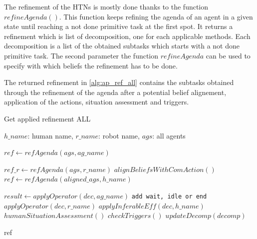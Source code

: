 \documentclass[letterpaper]{article} %
\begin{document}
The refinement of the HTNs is mostly done thanks to the function $refineAgenda()$. This function keeps refining the agenda of an agent in a given state until reaching a not done primitive task at the first spot. It returns a refinement which is list of decomposition, one for each applicable methods. Each decomposition is a list of the obtained subtasks which starts with a not done primitive task. The second parameter the function $refineAgenda$ can be used to specify with which beliefs the refinement has to be done. 

The returned refinement in \ref{alg:ap_ref_all} contains the subtasks obtained through the refinement of the agenda after a potential belief alignement, application of the actions, situation assessment and triggers.

\begin{algorithm}
\caption{Get applied refinement ALL}\label{alg:ap_ref_all}
\begin{algorithmic}
\Require $h\_name$: human name, $r\_name$: robot name, $ags$: all agents

\State $ref \gets refAgenda(ags, ag\_name)$

\State $ref\_r \gets refAgenda(ags, r\_name)$ 
 
    \State $alignBeliefsWithComAction()$
    \State $ref \gets refAgenda(aligned\_ags, h\_name)$
\EndIf


    \State $result \gets applyOperator(dec, ag\_name)$ 
        \State \texttt{add wait, idle or end}
    \Else
        \State $applyOperator(dec, r\_name)$ 
        \State $applyInferableEff(dec, h\_name)$ 
        \State $humanSituationAssessment()$
        \State $checkTriggers()$
        \State $updateDecomp(decomp)$
    \EndIf
\EndFor

\State \Return ref

\end{algorithmic}
\end{algorithm}
\end{document}
